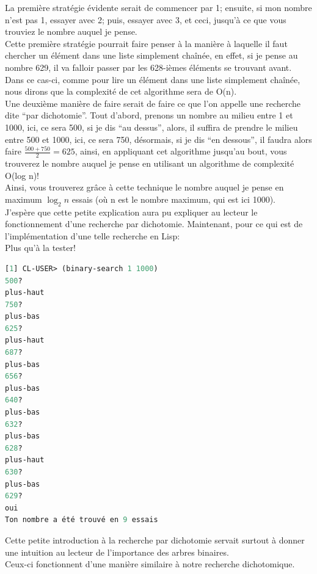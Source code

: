 \documentclass[a4paper, 12pt]{article}
\numberwithin{equation}{subsection}
\begin{document}
La première stratégie évidente serait de commencer par 1; ensuite, si mon nombre n'est pas 1, essayer avec 2; puis, essayer avec 3, et ceci, jusqu'à ce que vous trouviez le nombre auquel je pense. \\

Cette première stratégie pourrait faire penser à la manière à laquelle il faut chercher un élément dans une liste simplement chaînée, en effet, si je pense au nombre 629, il va falloir passer par les 628-ièmes éléments se trouvant avant. Dans ce cas-ci, comme pour lire un élément dans une liste simplement chaînée, nous dirons que la complexité de cet algorithme sera de O(n). \\

Une deuxième manière de faire serait de faire ce que l'on appelle une recherche dite ``par dichotomie''. Tout d'abord, prenons un nombre au milieu entre 1 et 1000, ici, ce sera 500, si je dis ``au dessus'', alors, il suffira de prendre le milieu entre 500 et 1000, ici, ce sera 750, désormais, si je dis ``en dessous'', il faudra alors faire $\frac{500 + 750}{2} = 625$, ainsi, en appliquant cet algorithme jusqu'au bout, vous trouverez le nombre auquel je pense en utilisant un algorithme de complexité O(log n)! \\

Ainsi, vous trouverez grâce à cette technique le nombre auquel je pense en maximum $\log_{2}{n}$ essais (où n est le nombre maximum, qui est ici 1000). \\

J'espère que cette petite explication aura pu expliquer au lecteur le fonctionnement d'une recherche par dichotomie. Maintenant, pour ce qui est de l'implémentation d'une telle recherche en Lisp: \\

Plus qu'à la tester!
\begin{lstlisting}[language=Lisp]
[1] CL-USER> (binary-search 1 1000)
500?
plus-haut
750?
plus-bas
625?
plus-haut
687?
plus-bas
656?
plus-bas
640?
plus-bas
632?
plus-bas
628?
plus-haut
630?
plus-bas
629?
oui
Ton nombre a été trouvé en 9 essais
\end{lstlisting}

Cette petite introduction à la recherche par dichotomie servait surtout à donner une intuition au lecteur de l'importance des arbres binaires. \\

Ceux-ci fonctionnent d'une manière similaire à notre recherche dichotomique. \\
\end{document}
